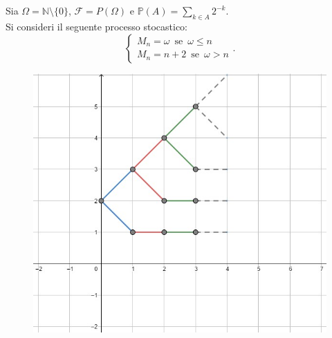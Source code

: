 \documentclass[11pt,largemargins]{homework}
\begin{document}
  \section{}%
  Sia $\Omega=\mathbb{N}\setminus \{0\}$, $\mathcal{F}=P\left(\Omega\right)$ e $\mathbb{P}\left(A\right)=\sum_{k\in A}2^{-k}$.\\
  Si consideri il seguente processo stocastico:
  \begin{equation*}
  \begin{cases} M_{n}=\omega \,\,\, \text{se} \,\,\, \omega\leq n\\M_{n}=n+2 \,\,\, \text{se} \,\,\, \omega> n\end{cases}.
  \end{equation*}
  \begin{figure}[htb]\centering
\includegraphics[scale=0.60]{martingalaex6.jpg}
  \end{figure}
  
\end{document}

